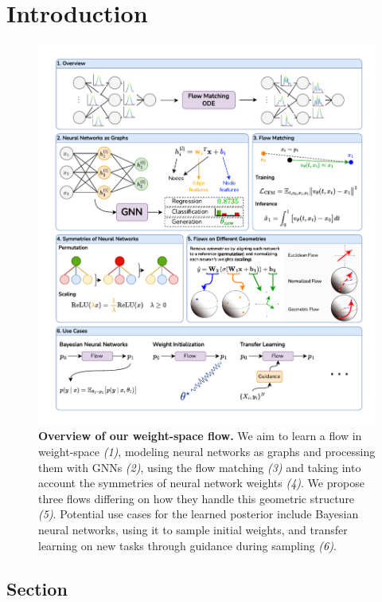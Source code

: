 
\chapter{Introduction}\label{chapter:introduction}

\begin{figure}[t!]
    \centering
    \includegraphics[width=\textwidth]{figures/weightflow.drawio.pdf}
    \caption{\label{fig:main}\textbf{Overview of our weight-space flow.} We aim to learn a flow in weight-space \textit{(1)}, modeling neural networks as graphs and processing them with GNNs \textit{(2)}, using the flow matching \textit{(3)} and taking into account the symmetries of neural network weights \textit{(4)}. We propose three flows differing on how they handle this geometric structure \textit{(5)}. Potential use cases for the learned posterior include Bayesian neural networks, using it to sample initial weights, and transfer learning on new tasks through guidance during sampling \textit{(6)}.}
\end{figure}

\section{Section}
